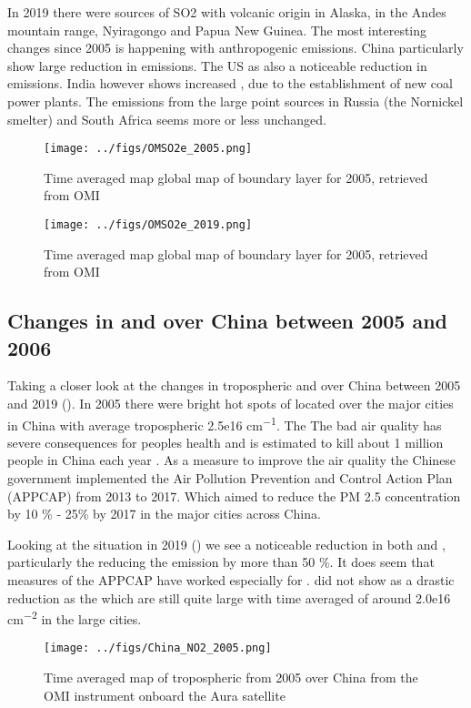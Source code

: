 In 2019  there were sources of SO2 with volcanic origin in Alaska, in  the Andes mountain range, Nyiragongo and Papua New Guinea. The most interesting changes since 2005 is happening with anthropogenic emissions. China particularly show large reduction in  emissions. The US as also a noticeable reduction in emissions. India however shows increased , due to the establishment of new coal power plants. The emissions from the large point sources in Russia (the Nornickel smelter) and South Africa seems more or less unchanged. 
\begin{figure}[htbp]
    \centering
        \texttt{[image: ../figs/OMSO2e\_2005.png]}
    \caption{Time averaged map global map of boundary layer  for 2005, retrieved from OMI}
    \label{fig:OMI_global_2005SO2}
\end{figure}

\begin{figure}[htbp]
    \centering
        \texttt{[image: ../figs/OMSO2e\_2019.png]}
    \caption{Time averaged map global map of boundary layer  for 2005, retrieved from OMI}
    \label{fig:OMI_global_2019SO2}
\end{figure}

\subsection{Changes in  and  over China between 2005 and 2006}

Taking a closer look at the changes in tropospheric  and  over China
between 2005 and 2019 (). In 2005 there were bright hot spots of  located
over the major cities in China with average tropospheric
 2.5e16 \si{cm^{-1}}. The  The bad air quality has severe consequences 
for peoples health and is estimated to kill about 1 million people in 
China each year \parencite{yue2020stronger}. As a measure to improve the 
air quality the Chinese government implemented the Air Pollution 
Prevention and Control Action Plan (APPCAP) from 2013 to 2017. Which 
aimed to reduce the PM 2.5 concentration by 10 \% - 25\% by 2017 in the major cities across China.      

Looking at the situation in 2019 () we see a noticeable reduction in both  and , particularly the  reducing the  emission by more than 50 \%. It does seem that measures of the APPCAP have worked especially for .  did not show as a drastic reduction as the   which are still quite large with time averaged  of around 2.0e16 \si{cm^{-2}} in the large cities. 
\begin{figure}[htpb]
    \centering
    \texttt{[image: ../figs/China\_NO2\_2005.png]}
    \caption{Time averaged map of tropospheric  from 2005 over China
    from the OMI instrument onboard the Aura satellite}
    \label{fig:OMI_ChinaNO2}
\end{figure}


